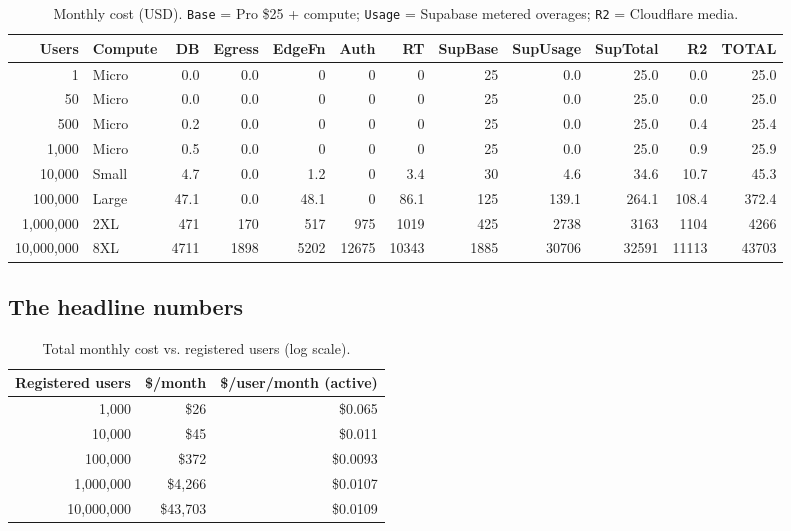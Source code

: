\documentclass[11pt]{article}
\begin{document}
\begin{table}[H]\centering\scriptsize
\caption{Monthly cost (USD). \texttt{Base} = Pro \$25 + compute; \texttt{Usage} = Supabase metered overages; \texttt{R2} = Cloudflare media.}
\begin{tabular}{r l r r r r r r r r r r}
\toprule
\textbf{Users} & \textbf{Compute} & \textbf{DB} & \textbf{Egress} & \textbf{EdgeFn} & \textbf{Auth} & \textbf{RT} & \textbf{SupBase} & \textbf{SupUsage} & \textbf{SupTotal} & \textbf{R2} & \textbf{TOTAL} \\
\midrule
1           & Micro  & 0.0  & 0.0   & 0      & 0    & 0   & 25  & 0.0   & 25.0  & 0.0    & 25.0    \\
50          & Micro  & 0.0  & 0.0   & 0      & 0    & 0   & 25  & 0.0   & 25.0  & 0.0    & 25.0    \\
500         & Micro  & 0.2  & 0.0   & 0      & 0    & 0   & 25  & 0.0   & 25.0  & 0.4    & 25.4    \\
1{,}000     & Micro  & 0.5  & 0.0   & 0      & 0    & 0   & 25  & 0.0   & 25.0  & 0.9    & 25.9    \\
\rowcolor{yellow!20} 10{,}000 & Small  & 4.7  & 0.0 & 1.2 & 0   & 3.4 & 30  & 4.6   & 34.6  & 10.7   & 45.3    \\
100{,}000   & Large  & 47.1 & 0.0   & 48.1   & 0    & 86.1& 125 & 139.1 & 264.1 & 108.4  & 372.4   \\
1{,}000{,}000 & 2XL  & 471  & 170   & 517    & 975  &1019 & 425 & 2738  & 3163  & 1104   & 4266    \\
10{,}000{,}000 & 8XL & 4711 & 1898  & 5202   & 12675& 10343&1885& 30706& 32591 & 11113  & 43703   \\
\bottomrule
\end{tabular}
\end{table}

\subsection{The headline numbers}

\begin{table}[H]\centering
\caption{Total monthly cost vs. registered users (log scale).}
\begin{tabular}{r r r}
\toprule
\textbf{Registered users} & \textbf{\$/month} & \textbf{\$/user/month (active)} \\
\midrule
1{,}000       & \$26     & \$0.065 \\
10{,}000      & \$45     & \$0.011 \\
100{,}000     & \$372    & \$0.0093 \\
1{,}000{,}000 & \$4{,}266& \$0.0107 \\
10{,}000{,}000& \$43{,}703& \$0.0109 \\
\bottomrule
\end{tabular}
\end{table}
\end{document}
